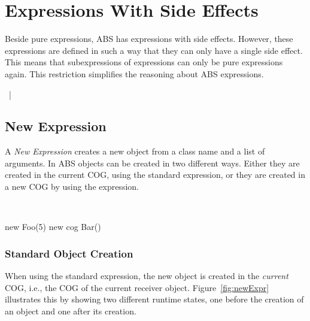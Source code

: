 \chapter{Expressions With Side Effects}
Beside pure expressions, ABS has expressions with side effects.
However, these expressions are defined in such a way that they can only have a
single side effect. This means that subexpressions of expressions can only be
pure expressions again. This restriction simplifies the reasoning about ABS
expressions.

\begin{abssyntax}
     {}
         ~|~ \\
  {}
           {}
           {}
           {}
\end{abssyntax}

\section{New Expression}
A \emph{New Expression} creates a new object from a class name and a list of arguments. In ABS objects can be created in two different ways.
Either they are created in the current COG, using the standard  expression,
or they are created in a new COG by using the  expression.

\begin{abssyntax}
  {}\ \ \ \TRS{(}  \TRS{)}  
\end{abssyntax}

\begin{absexample}
new Foo(5)
new cog Bar()
\end{absexample}

\subsection{Standard Object Creation}
When using the standard  expression, the new object is created in the \emph{current} COG, i.e., the COG of the current receiver object.
Figure~\ref{fig:newExpr} illustrates this by showing two different runtime states, one before the creation of an object  and one after its creation.

